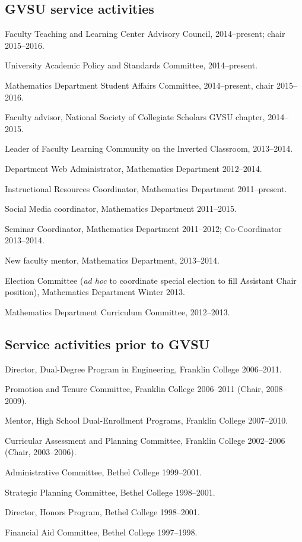 \documentclass[letterpaper]{article}
\renewenvironment{itemize}{
  \begin{list}{}{
    \setlength{\leftmargin}{1.5em}
	\setlength{\itemsep}{0in}
  }
}{
  \end{list}
}
\begin{document}
\subsection*{GVSU service activities}
\begin{itemize}
	\item Faculty Teaching and Learning Center Advisory Council, 2014--present; chair 2015--2016. 
	\item University Academic Policy and Standards Committee, 2014--present. 
	\item Mathematics Department Student Affairs Committee, 2014--present, chair 2015--2016. 
	\item Faculty advisor, National Society of Collegiate Scholars GVSU chapter, 2014--2015.
	\item Leader of Faculty Learning Community on the Inverted Classroom, 2013--2014. 
	\item Department Web Administrator, Mathematics Department 2012--2014.  
	\item Instructional Resources Coordinator, Mathematics Department 2011--present. 
	\item Social Media coordinator, Mathematics Department 2011--2015.
	\item Seminar Coordinator, Mathematics Department 2011--2012; Co-Coordinator 2013--2014. 
	\item New faculty mentor, Mathematics Department, 2013--2014. 
	\item Election Committee (\emph{ad hoc} to coordinate special election to fill Assistant Chair position), Mathematics Department Winter 2013. 
	\item Mathematics Department Curriculum Committee, 2012--2013. 
\end{itemize}

\subsection*{Service activities prior to GVSU}
\begin{itemize}
	\item Director, Dual-Degree Program in Engineering, Franklin College 2006--2011. 
	\item Promotion and Tenure Committee, Franklin College 2006--2011 (Chair, 2008--2009). 
	\item Mentor, High School Dual-Enrollment Programs, Franklin College 2007--2010. 
	\item Curricular Assessment and Planning Committee, Franklin College 2002--2006 (Chair, 2003--2006). 
	\item Administrative Committee, Bethel College 1999--2001. 
	\item Strategic Planning Committee, Bethel College 1998--2001. 
	\item Director, Honors Program, Bethel College 1998--2001. 
	\item Financial Aid Committee, Bethel College 1997--1998. 
\end{itemize}
\end{document}
